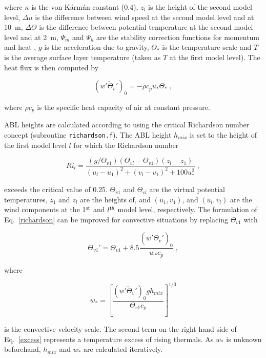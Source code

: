 \documentclass{egu}                  %
\begin{document}
where $\kappa$ is the von K\'{a}rm\'{a}n constant (0.4), $z_l$ is the height of
the second model level, $\Delta u$ is the difference between wind speed at the
second model level and at 10~m, $\Delta \Theta$ is the difference between
potential temperature at the second model level and at 2~m, $\Psi_m$ and
$\Psi_h$ are the stability correction functions for momentum and heat
\citep{businger1971, beljaars1991}, $g$ is the acceleration due to gravity,
$\Theta_*$ is the temperature scale and $\overline{T}$ is the average surface
layer temperature (taken as $T$ at the first model level).  The heat flux is
then computed by

\begin{equation}
(\overline{w'\Theta_v'})_0=-\rho c_p u_* \Theta_* \;,
\end{equation}

where $\rho c_p$ is the specific heat capacity of air at constant pressure.

ABL heights are calculated according to \citet{vogelezang1996} using the
critical Richardson number concept (subroutine \verb|richardson.f|).  The ABL
height $h_{mix}$ is set to the height of the first model level $l$ for which
the Richardson number

\begin{equation}
Ri_l=\frac{(g/\Theta_{v1})(\Theta_{vl}-\Theta_{v1})(z_l-z_1)}{(u_l-u_1)^2+(v_l-v_1)^2+100u_*^2}\;,
\label{richardson}
\end{equation}

exceeds the critical value of 0.25.  $\Theta_{v1}$ and $\Theta_{vl}$ are the
virtual potential temperatures, $z_1$ and $z_l$ are the heights of, and
$(u_1,v_1)$, and $(u_l,v_l)$ are the wind components at the 1$^{\rm st}$ and
$l^{\rm th}$ model level, respectively.  The formulation of
Eq.~\ref{richardson} can be improved for convective situations by replacing
$\Theta_{v1}$ with

\begin{equation}
\Theta_{v1}'=\Theta_{v1}+8.5\frac{(\overline{w'\Theta_v'})_0}{w_* c_p}\;,
\label{excess}
\end{equation}

where

\begin{equation}
w_*=\left[{ \frac{(\overline{w'\Theta_v'})_0 g h_{mix}}{\Theta_{v1} c_p} }\right]^{1/3}
\end{equation}

is the convective velocity scale.  The second term on the right hand side of
Eq.~\ref{excess} represents a temperature excess of rising thermals.  As $w_*$
is unknown beforehand, $h_{mix}$ and $w_*$ are calculated iteratively.
\end{document}
